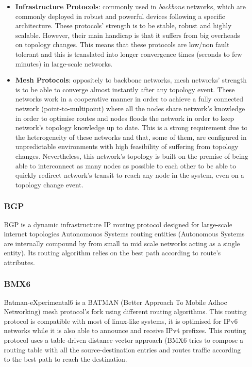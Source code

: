 \begin{itemize}
    \item \textbf{Infrastructure Protocols}: commonly used in \textit{backbone} networks, which are commonly deployed in robust and powerful devices following a specific architecture. These protocols' strength is to be stable, robust and highly scalable. However, their main handicap is that it suffers from big overheads on topology changes. This means that these protocols are low/non fault tolerant and this is translated into longer convergence times (seconds to few minutes) in large-scale networks.

    \item \textbf{Mesh Protocols}: oppositely to backbone networks, mesh networks' strength is to be able to converge almost instantly after any topology event. These networks work in a cooperative manner in order to achieve a fully connected network (point-to-multipoint) where all the nodes share network's knowledge in order to optimise routes and nodes floods the network in order to keep network's topology knowledge up to date. This is a strong requirement due to the heterogeneity of these networks and that, some of them, are configured in unpredictable environments with high feasibility of suffering from topology changes. Nevertheless, this network's topology is built on the premise of being able to interconnect as many nodes as possible to each other to be able to quickly redirect network's transit to reach any node in the system, even on a topology change event.
\end{itemize}

\subsubsection{BGP}
\label{subsubsec:bgp}
BGP is a dynamic infrastructure IP routing protocol designed for large-scale internet topologies Autonomouos Systems routing entities (Autonomous Systems are internally compound by from small to mid scale networks acting as a single entity). Its routing algorithm relies on the best path according to route's attributes.

\subsubsection{BMX6}
\label{subsec:bmx6}
Batman-eXperimental6 \cite{bmx6} is a BATMAN (Better Approach To Mobile Adhoc Networking) mesh protocol's fork using different routing algorithms. This routing protocol is compatible with most of linux-like systems, it is optimised for IPv6 networks while it is also able to announce and receive IPv4 prefixes. This routing protocol uses a table-driven distance-vector approach (BMX6 tries to compose a routing table with all the source-destination entries and routes traffic according to the best path to reach the destination.

